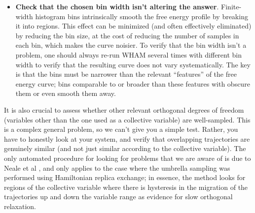 \begin{itemize}
    \item \textbf{Check that the chosen bin width isn't altering the answer}.
    Finite-width histogram bins intrinsically smooth the free energy profile by
    breaking it into regions.  This effect can be minimized (and often
    effectively eliminated) by reducing the bin size, at the cost of reducing
    the number of samples in each bin, which makes the curve noisier.  To verify
    that the bin width isn't a problem, one should always re-run WHAM several
    times with different bin width to verify that the resulting curve does not
    vary systematically.  The key is that the bins must be narrower than the
    relevant ``features'' of the free energy curve; bins comparable to or
    broader than these features with obscure them or even smooth them away.

\end{itemize}

It is also crucial to assess whether other relevant orthogonal degrees of
freedom (variables other than the one used as a collective variable) are
well-sampled.  This is a complex general problem, so we can't give you a simple
test.  Rather, you have to honestly look at your system, and verify that
overlapping trajectories are genuinely similar (and not just similar according
to the collective variable).  The only automated procedure for looking for
problems that we are aware of is due to Neale et al \cite{Pomes-2014}, and only
applies to the case where the umbrella sampling was performed using Hamiltonian
replica exchange; in essence, the method looks for regions of the collective
variable where there is hysteresis in the migration of the trajectories up and
down the variable range as evidence for slow orthogonal relaxation.
